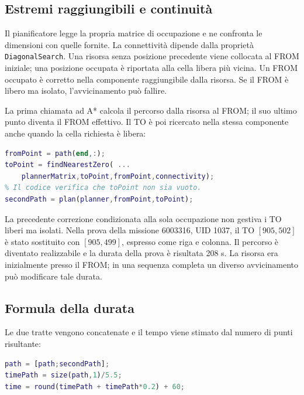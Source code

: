 \subsection{Estremi raggiungibili e continuità}

Il pianificatore legge la propria matrice di occupazione e ne confronta le
dimensioni con quelle fornite. La connettività dipende dalla proprietà
\texttt{DiagonalSearch}. Una risorsa senza posizione precedente viene
collocata al FROM iniziale; una posizione occupata è riportata alla cella
libera più vicina. Un FROM occupato è corretto nella componente raggiungibile
dalla risorsa. Se il FROM è libero ma isolato, l'avvicinamento può fallire.

La prima chiamata ad A* calcola il percorso dalla risorsa al FROM; il suo
ultimo punto diventa il FROM effettivo. Il TO è poi ricercato nella stessa
componente anche quando la cella richiesta è libera:

\begin{lstlisting}[language=Matlab,caption={Estratto della correzione del TO e della seconda tratta.},label={lst:impl-to}]
fromPoint = path(end,:);
toPoint = findNearestZero( ...
    plannerMatrix,toPoint,fromPoint,connectivity);
% Il codice verifica che toPoint non sia vuoto.
secondPath = plan(planner,fromPoint,toPoint);
\end{lstlisting}

La precedente correzione condizionata alla sola occupazione non gestiva i
TO liberi ma isolati. Nella prova della missione 6003316, UID 1037, il TO
$[905,502]$ è stato sostituito con $[905,499]$, espresso come riga e colonna.
Il percorso è diventato realizzabile e la durata della prova è risultata
208 s. La risorsa era inizialmente presso il FROM; in una sequenza completa
un diverso avvicinamento può modificare tale durata.

\subsection{Formula della durata}

Le due tratte vengono concatenate e il tempo viene stimato dal numero
di punti risultante:

\begin{lstlisting}[language=Matlab,caption={Durata simulata del percorso concatenato.},label={lst:impl-durata}]
path = [path;secondPath];
timePath = size(path,1)/5.5;
time = round(timePath + timePath*0.2) + 60;
\end{lstlisting}

